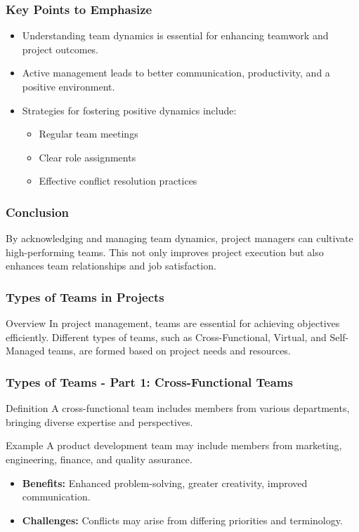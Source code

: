 \documentclass[aspectratio=169]{beamer}
\begin{document}
\begin{frame}[fragile]
    \frametitle{Key Points to Emphasize}
    \begin{itemize}
        \item Understanding team dynamics is essential for enhancing teamwork and project outcomes.
        \item Active management leads to better communication, productivity, and a positive environment.
        \item Strategies for fostering positive dynamics include:
            \begin{itemize}
                \item Regular team meetings 
                \item Clear role assignments
                \item Effective conflict resolution practices
            \end{itemize}
    \end{itemize}
\end{frame}

\begin{frame}[fragile]
    \frametitle{Conclusion}
    By acknowledging and managing team dynamics, project managers can cultivate high-performing teams. This not only improves project execution but also enhances team relationships and job satisfaction.
\end{frame}

\begin{frame}[fragile]
    \frametitle{Types of Teams in Projects}
    \begin{block}{Overview}
        In project management, teams are essential for achieving objectives efficiently. Different types of teams, such as Cross-Functional, Virtual, and Self-Managed teams, are formed based on project needs and resources.
    \end{block}
\end{frame}

\begin{frame}[fragile]
    \frametitle{Types of Teams - Part 1: Cross-Functional Teams}
    \begin{block}{Definition}
        A cross-functional team includes members from various departments, bringing diverse expertise and perspectives.
    \end{block}
    
    \begin{exampleblock}{Example}
        A product development team may include members from marketing, engineering, finance, and quality assurance.
    \end{exampleblock}
    
    \begin{itemize}
        \item \textbf{Benefits:} Enhanced problem-solving, greater creativity, improved communication.
        \item \textbf{Challenges:} Conflicts may arise from differing priorities and terminology.
    \end{itemize}
\end{frame}
\end{document}
